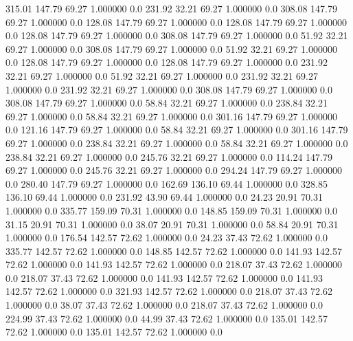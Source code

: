   315.01  147.79   69.27    1.000000    0.0
  231.92   32.21   69.27    1.000000    0.0
  308.08  147.79   69.27    1.000000    0.0
  128.08  147.79   69.27    1.000000    0.0
  128.08  147.79   69.27    1.000000    0.0
  128.08  147.79   69.27    1.000000    0.0
  308.08  147.79   69.27    1.000000    0.0
   51.92   32.21   69.27    1.000000    0.0
  308.08  147.79   69.27    1.000000    0.0
   51.92   32.21   69.27    1.000000    0.0
  128.08  147.79   69.27    1.000000    0.0
  128.08  147.79   69.27    1.000000    0.0
  231.92   32.21   69.27    1.000000    0.0
   51.92   32.21   69.27    1.000000    0.0
  231.92   32.21   69.27    1.000000    0.0
  231.92   32.21   69.27    1.000000    0.0
  308.08  147.79   69.27    1.000000    0.0
  308.08  147.79   69.27    1.000000    0.0
   58.84   32.21   69.27    1.000000    0.0
  238.84   32.21   69.27    1.000000    0.0
   58.84   32.21   69.27    1.000000    0.0
  301.16  147.79   69.27    1.000000    0.0
  121.16  147.79   69.27    1.000000    0.0
   58.84   32.21   69.27    1.000000    0.0
  301.16  147.79   69.27    1.000000    0.0
  238.84   32.21   69.27    1.000000    0.0
   58.84   32.21   69.27    1.000000    0.0
  238.84   32.21   69.27    1.000000    0.0
  245.76   32.21   69.27    1.000000    0.0
  114.24  147.79   69.27    1.000000    0.0
  245.76   32.21   69.27    1.000000    0.0
  294.24  147.79   69.27    1.000000    0.0
  280.40  147.79   69.27    1.000000    0.0
  162.69  136.10   69.44    1.000000    0.0
  328.85  136.10   69.44    1.000000    0.0
  231.92   43.90   69.44    1.000000    0.0
   24.23   20.91   70.31    1.000000    0.0
  335.77  159.09   70.31    1.000000    0.0
  148.85  159.09   70.31    1.000000    0.0
   31.15   20.91   70.31    1.000000    0.0
   38.07   20.91   70.31    1.000000    0.0
   58.84   20.91   70.31    1.000000    0.0
  176.54  142.57   72.62    1.000000    0.0
   24.23   37.43   72.62    1.000000    0.0
  335.77  142.57   72.62    1.000000    0.0
  148.85  142.57   72.62    1.000000    0.0
  141.93  142.57   72.62    1.000000    0.0
  141.93  142.57   72.62    1.000000    0.0
  218.07   37.43   72.62    1.000000    0.0
  218.07   37.43   72.62    1.000000    0.0
  141.93  142.57   72.62    1.000000    0.0
  141.93  142.57   72.62    1.000000    0.0
  321.93  142.57   72.62    1.000000    0.0
  218.07   37.43   72.62    1.000000    0.0
   38.07   37.43   72.62    1.000000    0.0
  218.07   37.43   72.62    1.000000    0.0
  224.99   37.43   72.62    1.000000    0.0
   44.99   37.43   72.62    1.000000    0.0
  135.01  142.57   72.62    1.000000    0.0
  135.01  142.57   72.62    1.000000    0.0
